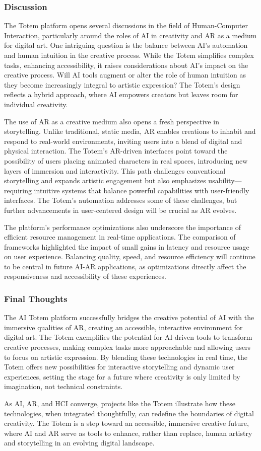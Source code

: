 \subsubsection{Discussion}
The Totem platform opens several discussions in the field of Human-Computer Interaction, particularly around the roles of AI in creativity and AR as a medium for digital art.
One intriguing question is the balance between AI’s automation and human intuition in the creative process.
While the Totem simplifies complex tasks, enhancing accessibility, it raises considerations about AI’s impact on the creative process.
Will AI tools augment or alter the role of human intuition as they become increasingly integral to artistic expression?
The Totem’s design reflects a hybrid approach, where AI empowers creators but leaves room for individual creativity.

The use of AR as a creative medium also opens a fresh perspective in storytelling.
Unlike traditional, static media, AR enables creations to inhabit and respond to real-world environments, inviting users into a blend of digital and physical interaction.
The Totem’s AR-driven interfaces point toward the possibility of users placing animated characters in real spaces, introducing new layers of immersion and interactivity.
This path challenges conventional storytelling and expands artistic engagement but also emphasizes usability—requiring intuitive systems that balance powerful capabilities with user-friendly interfaces.
The Totem’s automation addresses some of these challenges, but further advancements in user-centered design will be crucial as AR evolves.

The platform’s performance optimizations also underscore the importance of efficient resource management in real-time applications.
The comparison of frameworks highlighted the impact of small gains in latency and resource usage on user experience.
Balancing quality, speed, and resource efficiency will continue to be central in future AI-AR applications, as optimizations directly affect the responsiveness and accessibility of these experiences.

\subsubsection{Final Thoughts}
The AI Totem platform successfully bridges the creative potential of AI with the immersive qualities of AR, creating an accessible, interactive environment for digital art.
The Totem exemplifies the potential for AI-driven tools to transform creative processes, making complex tasks more approachable and allowing users to focus on artistic expression.
By blending these technologies in real time, the Totem offers new possibilities for interactive storytelling and dynamic user experiences, setting the stage for a future where creativity is only limited by imagination, not technical constraints.

As AI, AR, and HCI converge, projects like the Totem illustrate how these technologies, when integrated thoughtfully, can redefine the boundaries of digital creativity.
The Totem is a step toward an accessible, immersive creative future, where AI and AR serve as tools to enhance, rather than replace, human artistry and storytelling in an evolving digital landscape.